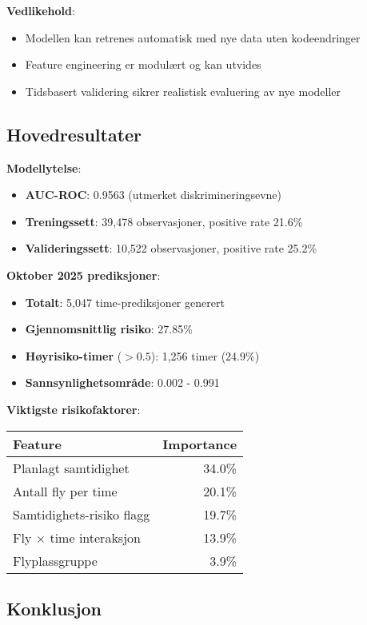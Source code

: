 \documentclass[11pt,a4paper]{article}
\begin{document}
\textbf{Vedlikehold}:
\begin{itemize}
    \item Modellen kan retrenes automatisk med nye data uten kodeendringer
    \item Feature engineering er modulært og kan utvides
    \item Tidsbasert validering sikrer realistisk evaluering av nye modeller
\end{itemize}

\subsection{Hovedresultater}

\textbf{Modellytelse}:
\begin{itemize}
    \item \textbf{AUC-ROC}: 0.9563 (utmerket diskrimineringsevne)
    \item \textbf{Treningssett}: 39,478 observasjoner, positive rate 21.6\%
    \item \textbf{Valideringssett}: 10,522 observasjoner, positive rate 25.2\%
\end{itemize}

\textbf{Oktober 2025 prediksjoner}:
\begin{itemize}
    \item \textbf{Totalt}: 5,047 time-prediksjoner generert
    \item \textbf{Gjennomsnittlig risiko}: 27.85\%
    \item \textbf{Høyrisiko-timer} ($>0.5$): 1,256 timer (24.9\%)
    \item \textbf{Sannsynlighetsområde}: 0.002 - 0.991
\end{itemize}

\textbf{Viktigste risikofaktorer}:
\begin{center}
\begin{tabular}{lr}
\toprule
Feature & Importance \\
\midrule
Planlagt samtidighet & 34.0\% \\
Antall fly per time & 20.1\% \\
Samtidighets-risiko flagg & 19.7\% \\
Fly × time interaksjon & 13.9\% \\
Flyplassgruppe & 3.9\% \\
\bottomrule
\end{tabular}
\end{center}

\subsection{Konklusjon}
\end{document}
